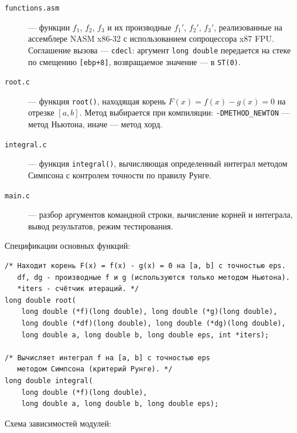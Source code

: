 \documentclass[a4paper,12pt,titlepage,finall]{article}
\begin{document}
\begin{description}
    \item[\texttt{functions.asm}] ---
        функции $f_1$, $f_2$, $f_3$ и их производные $f_1'$, $f_2'$, $f_3'$,
        реализованные на ассемблере NASM x86-32 с использованием сопроцессора x87 FPU.
        Соглашение вызова --- \texttt{cdecl}: аргумент \texttt{long double}
        передается на стеке по смещению \texttt{[ebp+8]}, возвращаемое значение --- в \texttt{ST(0)}.

    \item[\texttt{root.c}] ---
        функция \texttt{root()}, находящая корень $F(x) = f(x) - g(x) = 0$ на отрезке $[a, b]$.
        Метод выбирается при компиляции:
        \texttt{-DMETHOD\_NEWTON} --- метод Ньютона,
        иначе --- метод хорд.

    \item[\texttt{integral.c}] ---
        функция \texttt{integral()}, вычисляющая определенный интеграл
        методом Симпсона с контролем точности по правилу Рунге.

    \item[\texttt{main.c}] ---
        разбор аргументов командной строки, вычисление корней и интеграла,
        вывод результатов, режим тестирования.
\end{description}

\medskip
\noindent Спецификации основных функций:

\begin{lstlisting}
/* Находит корень F(x) = f(x) - g(x) = 0 на [a, b] с точностью eps.
   df, dg - производные f и g (используются только методом Ньютона).
   *iters - счётчик итераций. */
long double root(
    long double (*f)(long double), long double (*g)(long double),
    long double (*df)(long double), long double (*dg)(long double),
    long double a, long double b, long double eps, int *iters);

/* Вычисляет интеграл f на [a, b] с точностью eps
   методом Симпсона (критерий Рунге). */
long double integral(
    long double (*f)(long double),
    long double a, long double b, long double eps);
\end{lstlisting}

\medskip
\noindent Схема зависимостей модулей:

\begin{center}
\end{center}
\end{document}
